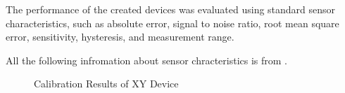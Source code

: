 The performance of the created devices was evaluated using standard sensor characteristics, such as absolute error, signal to noise ratio, root mean square error, sensitivity, hysteresis, and measurement range.

All the following infromation about sensor chracteristics is from \cite{kalantar-zadeh_sensors_2013}.

\begin{figure}[h]%
\centering
{}%
\qquad
{}%
\caption{Calibration Results of XY Device}
\label{fig:XY_calib_res}%
\end{figure}


